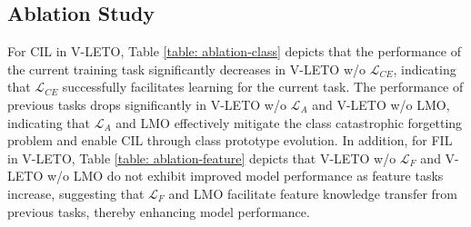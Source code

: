 \subsection{Ablation Study}
For CIL in V-LETO, Table \ref{table: ablation-class} depicts that the performance of the current training task significantly decreases in V-LETO w/o $\mathcal{L}_{CE}$, indicating that $\mathcal{L}_{CE}$ successfully facilitates learning for the current task. 
The performance of previous tasks drops significantly in V-LETO w/o $\mathcal{L}_{A}$ and V-LETO w/o LMO, indicating that $\mathcal{L}_{A}$ and LMO effectively mitigate the class catastrophic forgetting problem and enable CIL through class prototype evolution.
In addition, for FIL in V-LETO, Table \ref{table: ablation-feature} depicts that V-LETO w/o $\mathcal{L}_{F}$ and V-LETO w/o LMO do not exhibit improved model performance as feature tasks increase, suggesting that $\mathcal{L}_{F}$ and LMO facilitate feature knowledge transfer from previous tasks, thereby enhancing model performance. 



